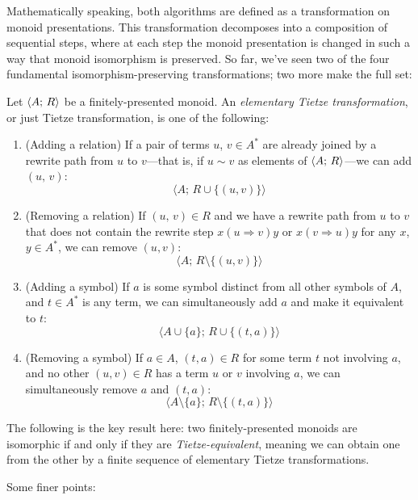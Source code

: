\documentclass[../generics]{subfiles}
\begin{document}
Mathematically speaking, both algorithms are defined as a transformation on monoid presentations. This transformation decomposes into a composition of sequential steps, where at each step the monoid presentation is changed in such a way that monoid isomorphism is preserved. So far, we've seen two of the four fundamental isomorphism-preserving transformations; two more make the full set:
\begin{definition}
Let $\langle A;\,R\rangle$ be a finitely-presented monoid. An \emph{elementary Tietze transformation}, or just Tietze transformation, is one of the following:
\begin{enumerate}
\item (Adding a relation) If a pair of terms $u$, $v\in A^*$ are already joined by a rewrite path from $u$ to $v$---that is, if $u\sim v$ as elements of $\langle A;\,R\rangle$---we can add $(u,\,v)$:
\[\langle A;\,R\cup\{(u,v)\}\rangle\]
\item (Removing a relation) If $(u,\,v)\in R$ and we have a rewrite path from $u$ to $v$ that does not contain the rewrite step $x(u\Rightarrow v)y$ or $x(v\Rightarrow u)y$ for any $x$, $y\in A^*$, we can remove $(u,v)$:
\[\langle A;\,R\setminus\{(u,v)\}\rangle\]
\item (Adding a symbol) If $a$ is some symbol distinct from all other symbols of $A$, and $t\in A^*$ is any term, we can simultaneously add $a$ and make it equivalent to $t$:
\[\langle A\cup\{a\};\,R\cup\{(t,a)\}\rangle\]
\item (Removing a symbol) If $a\in A$, $(t,a)\in R$ for some term $t$ not involving $a$, and no other $(u,v)\in R$ has a term $u$ or $v$ involving $a$, we can simultaneously remove $a$ and $(t,a)$:
\[\langle A\setminus\{a\};\,R\setminus\{(t,a)\}\rangle\]
\end{enumerate}
The following is the key result here: two finitely-presented monoids are isomorphic if and only if they are \emph{Tietze-equivalent}, meaning we can obtain one from the other by a finite sequence of elementary Tietze transformations.
\end{definition}
Some finer points:
\end{document}

